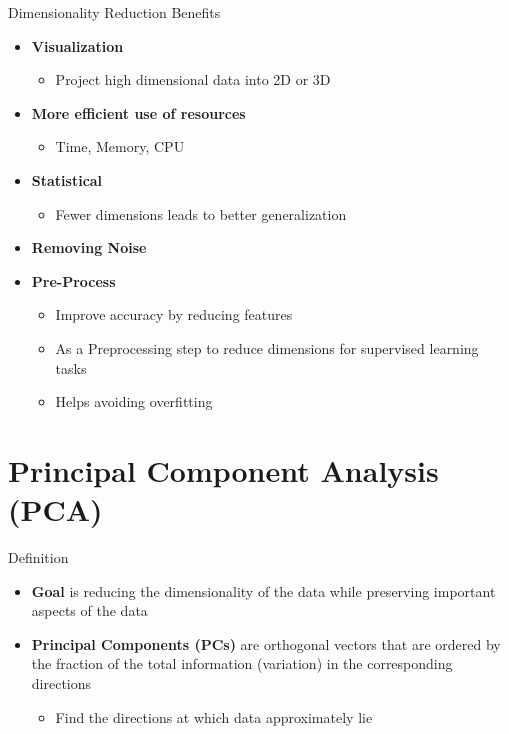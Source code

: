 \documentclass[serif, aspectratio=169]{beamer}
\begin{document}
\begin{frame}{Dimensionality Reduction Benefits}
    \begin{itemize}
        \item \textbf{Visualization}
            \begin{itemize}
                \item Project high dimensional data into 2D or 3D
            \end{itemize}
        \item \textbf{More efficient use of resources}
            \begin{itemize}
                \item Time, Memory, CPU
            \end{itemize}
        \item \textbf{Statistical}
            \begin{itemize}
                \item Fewer dimensions leads to better generalization
            \end{itemize}
        \item \textbf{Removing Noise}
        \item \textbf{Pre-Process}
            \begin{itemize}
                \item Improve accuracy by reducing features
                \item As a Preprocessing step to reduce dimensions for supervised learning tasks
                \item Helps avoiding overfitting
            \end{itemize}
    \end{itemize}
\end{frame}

\section{Principal Component Analysis (PCA)}

\begin{frame}{Definition}
    \begin{itemize}
        \item \textbf{Goal} is reducing the dimensionality of the data while preserving important aspects of the data
        \item \textbf{Principal Components (PCs)} are orthogonal vectors that are ordered by the fraction of the total information (variation) in the corresponding directions
        \begin{itemize}
            \item Find the directions at which data approximately lie
        \end{itemize}
    \end{itemize}
\end{frame}
\end{document}
